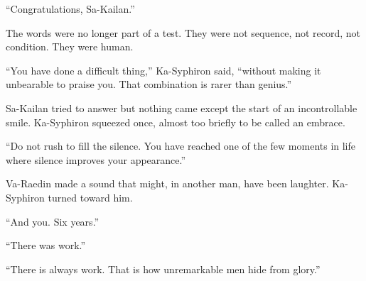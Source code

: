 “Congratulations, Sa-Kailan.”\par
The words were no longer part of a test. They were not sequence, not record, not condition. They were human.\par
“You have done a difficult thing,” Ka-Syphiron said, “without making it unbearable to praise you. That combination is rarer than genius.”\par
Sa-Kailan tried to answer but nothing came except the start of an incontrollable smile. Ka-Syphiron squeezed once, almost too briefly to be called an embrace.\par
“Do not rush to fill the silence. You have reached one of the few moments in life where silence improves your appearance.”\par
Va-Raedin made a sound that might, in another man, have been laughter. Ka-Syphiron turned toward him.\par
“And you. Six years.”\par
“There was work.”\par
“There is always work. That is how unremarkable men hide from glory.”\par


